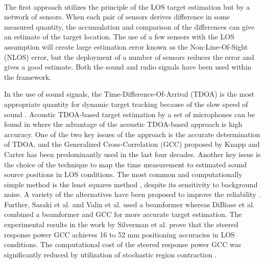 \documentclass[letterpaper, 10 pt, conference]{ieeeconf}  %
\begin{document}
\\
The first approach utilizes the principle of the LOS target estimation but by a network of sensors.  When each pair of sensors derives difference in some measured quantity, the accumulation and comparison of the differences can give an estimate of the target location.  The use of a few sensors with the LOS assumption will create large estimation error known as the Non-Line-Of-Sight (NLOS) error, but the deployment of a number of sensors reduces the error and gives a good estimate.  Both the sound and radio signals have been used within the framework.  

In the use of sound signals, the Time-Difference-Of-Arrival (TDOA) is the most appropriate quantity for dynamic target tracking because of the slow speed of sound \cite{girod2001robust}.  Acoustic TDOA-based target estimation by a set of microphones can be found in \cite{do2007real,silverman2005performance,valin2003robust,ward2003particle,rib05} where the advantage of the acoustic TDOA-based approach is high accuracy.  One of the two key issues of the approach is the accurate determination of TDOA, and the Generalized Cross-Correlation (GCC) proposed by Knapp and Carter \cite{knapp1976generalized} has been  predominantly used in the last four decades.  Another key issue is the choice of the technique to map the time measurement to estimated sound source  positions in LOS conditions.  The most common and computationally simple method is the least squares method \cite{frampton2006acoustic}, despite its sensitivity to background noise. A variety of the alternatives have been proposed to improve the reliability \cite{mumolo2003algorithms,ward1999grid,valin2007robust,ward2003particle}. Further, Sasaki et al. \cite{sasaki2006multiple} and Valin et al. \cite{valin2004localization,valin2006robust,valin2007robust,valin2003robust} used a beamformer whereas  DiBiase  et  al. \cite{dibiase2000high,dibiase2001robust} combined a beamformer and GCC for more accurate target estimation.  The experimental results in the work by Silverman et al. \cite{silverman2005performance} prove that the steered response power GCC achieves 16 to 52 mm positioning accuracies in LOS conditions. The computational cost of the steered response power GCC was significantly reduced by utilization of stochastic region contraction \cite{do2007real}.  
\end{document}
